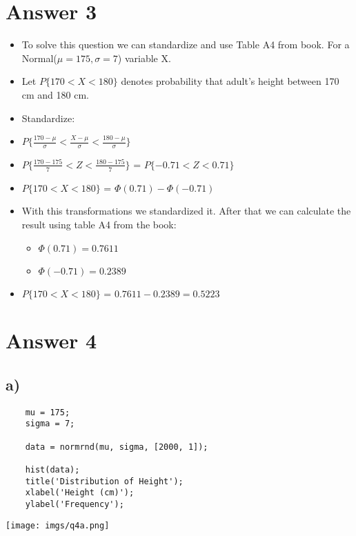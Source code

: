 \documentclass[12pt]{article}
\begin{document}
\section*{Answer 3}
\begin{itemize}
    \item To solve this question we can standardize and use Table A4 from book. For a Normal($\mu = 175, \sigma = 7$) variable X.
    \item Let $P\{170 < X < 180\}$ denotes probability that adult's height between 170 cm and 180 cm.
    \item Standardize: 
    \item  $P\{\frac{170 - \mu}{\sigma} < \frac{X - \mu}{\sigma} < \frac{180 - \mu}{\sigma}\}$
    \item $P\{\frac{170 - 175}{7} < Z < \frac{180 - 175}{7}\}$ = $P \{-0.71 < Z < 0.71\}$
    \item $P\{170 < X < 180\}$ = $\Phi(0.71) - \Phi(-0.71)$
    \item With this transformations we standardized it. After that we can calculate the result using table A4 from the book: 
    \begin{itemize}
        \item $\Phi(0.71) = 0.7611$
        \item $\Phi(-0.71) = 0.2389$
    \end{itemize}
    \item $P\{170 < X < 180\}$ = $0.7611-0.2389 = 0.5223$
\end{itemize}


\section*{Answer 4}
\subsection*{a)}
\begin{verbatim}
    mu = 175; 
    sigma = 7;
    
    data = normrnd(mu, sigma, [2000, 1]);
    
    hist(data);
    title('Distribution of Height');
    xlabel('Height (cm)');
    ylabel('Frequency');
\end{verbatim}
\texttt{[image: imgs/q4a.png]}
\end{document}
